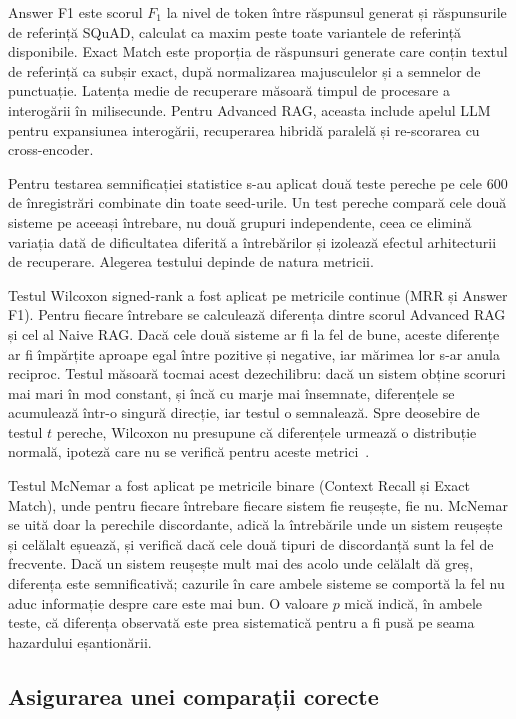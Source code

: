 Answer F1 este scorul $F_1$ la nivel de token între răspunsul generat și răspunsurile de referință SQuAD, calculat ca maxim peste toate variantele de referință disponibile. Exact Match este proporția de răspunsuri generate care conțin textul de referință ca subșir exact, după normalizarea majusculelor și a semnelor de punctuație. Latența medie de recuperare măsoară timpul de procesare a interogării în milisecunde. Pentru Advanced RAG, aceasta include apelul LLM pentru expansiunea interogării, recuperarea hibridă paralelă și re-scorarea cu cross-encoder.

Pentru testarea semnificației statistice s-au aplicat două teste pereche pe cele 600 de înregistrări combinate din toate seed-urile. Un test pereche compară cele două sisteme pe aceeași întrebare, nu două grupuri independente, ceea ce elimină variația dată de dificultatea diferită a întrebărilor și izolează efectul arhitecturii de recuperare. Alegerea testului depinde de natura metricii.

Testul Wilcoxon signed-rank a fost aplicat pe metricile continue (MRR și Answer F1). Pentru fiecare întrebare se calculează diferența dintre scorul Advanced RAG și cel al Naive RAG. Dacă cele două sisteme ar fi la fel de bune, aceste diferențe ar fi împărțite aproape egal între pozitive și negative, iar mărimea lor s-ar anula reciproc. Testul măsoară tocmai acest dezechilibru: dacă un sistem obține scoruri mai mari în mod constant, și încă cu marje mai însemnate, diferențele se acumulează într-o singură direcție, iar testul o semnalează. Spre deosebire de testul $t$ pereche, Wilcoxon nu presupune că diferențele urmează o distribuție normală, ipoteză care nu se verifică pentru aceste metrici~\cite{rajpurkar-etal-2016-squad}.

Testul McNemar a fost aplicat pe metricile binare (Context Recall și Exact Match), unde pentru fiecare întrebare fiecare sistem fie reușește, fie nu. McNemar se uită doar la perechile discordante, adică la întrebările unde un sistem reușește și celălalt eșuează, și verifică dacă cele două tipuri de discordanță sunt la fel de frecvente. Dacă un sistem reușește mult mai des acolo unde celălalt dă greș, diferența este semnificativă; cazurile în care ambele sisteme se comportă la fel nu aduc informație despre care este mai bun. O valoare $p$ mică indică, în ambele teste, că diferența observată este prea sistematică pentru a fi pusă pe seama hazardului eșantionării.

\subsection{Asigurarea unei comparații corecte}

